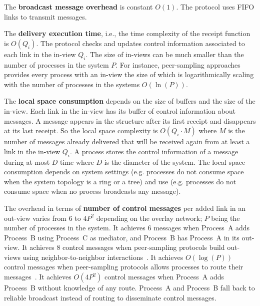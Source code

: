\noindent The \textbf{broadcast message overhead} is constant $O(1)$. The
protocol uses FIFO links to transmit messages.

\noindent The \textbf{delivery execution time}, i.e., the time complexity of the
receipt function is $O(Q_i)$.  The protocol checks and updates control
information associated to each link in the in-view $Q_i$. The size of in-views
can be much smaller than the number of processes in the system $P$. For
instance, peer-sampling approaches~\cite{ganesh2001scamp,nedelec2017adaptive}
provides every process with an in-view the size of which is logarithmically
scaling with the number of processes in the systems $O(\ln(P))$.

\noindent The \textbf{local space consumption} depends on the size of buffers
and the size of the in-view. Each link in the in-view has its buffer of control
information about messages. A message appears in the structure after its first
receipt and disappears at its last receipt. So the local space complexity is
$O(Q_i \cdot M)$ where $M$ is the number of messages already delivered that will
be received again from at least a link in the in-view $Q_i$. A process stores the
control information of a message during at most $D$ time where $D$ is the
diameter of the system. The local space consumption depends on system settings
(e.g. processes do not consume space when the system topology is a ring or a
tree) and use (e.g. processes do not consume space when no process broadcasts
any message).

\noindent The overhead in terms of \textbf{number of control messages} per added
link in an out-view varies from $6$ to $4P^2$ depending on the overlay network;
$P$ being the number of processes in the system. It achieves $6$ messages when
Process~A adds Process~B using Process~C as mediator, and Process~B has
Process~A in its out-view.  It achieves $8$ control messages when peer-sampling
protocols build out-views using neighbor-to-neighbor
interactions~\cite{jelasity2007gossip,nedelec2017adaptive}. It achieves
$O(\log(P))$ control messages when peer-sampling protocols allows processes to
route their messages~\cite{jelasity2009tman,stoica2001chord}.  It achieves
$O(4P^2)$ control messages when Process~A adds Process~B without knowledge of
any route. Process~A and Process~B fall back to reliable broadcast instead of
routing to disseminate control messages.

